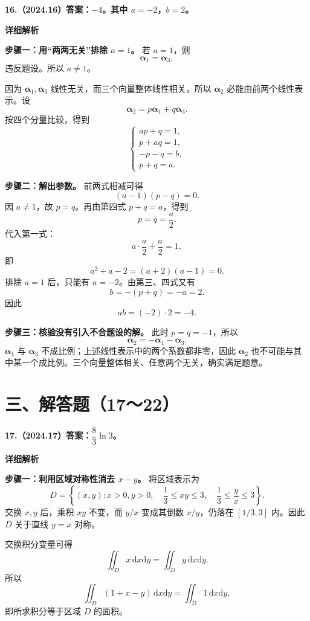 \documentclass[UTF8,11pt,fontset=windows]{ctexart}
\begin{document}
\clearpage

\textbf{16.（2024.16）答案：$-4$。其中 $a=-2$，$b=2$。}

\textbf{详细解析}

\textbf{步骤一：用“两两无关”排除 $a=1$。} 若 $a=1$，则
$$
\boldsymbol\alpha_1=\boldsymbol\alpha_3,
$$
违反题设。所以 $a\ne1$。

因为 $\boldsymbol\alpha_1,\boldsymbol\alpha_3$ 线性无关，而三个向量整体线性相关，所以 $\boldsymbol\alpha_2$ 必能由前两个线性表示。设
$$
\boldsymbol\alpha_2=p\boldsymbol\alpha_1+q\boldsymbol\alpha_3.
$$
按四个分量比较，得到
$$
\begin{cases}
ap+q=1,\\
p+aq=1,\\
-p-q=b,\\
p+q=a.
\end{cases}
$$

\textbf{步骤二：解出参数。} 前两式相减可得
$$
(a-1)(p-q)=0.
$$
因 $a\ne1$，故 $p=q$。再由第四式 $p+q=a$，得到
$$
p=q=\frac a2.
$$
代入第一式：
$$
a\cdot\frac a2+\frac a2=1,
$$
即
$$
a^2+a-2=(a+2)(a-1)=0.
$$
排除 $a=1$ 后，只能有 $a=-2$。由第三、四式又有
$$
b=-(p+q)=-a=2.
$$
因此
$$
\boxed{ab=(-2)\cdot2=-4}.
$$

\textbf{步骤三：核验没有引入不合题设的解。} 此时 $p=q=-1$，所以
$$
\boldsymbol\alpha_2=-\boldsymbol\alpha_1-\boldsymbol\alpha_3.
$$
$\boldsymbol\alpha_1$ 与 $\boldsymbol\alpha_3$ 不成比例；上述线性表示中的两个系数都非零，因此 $\boldsymbol\alpha_2$ 也不可能与其中某一个成比例。三个向量整体相关、任意两个无关，确实满足题意。

\clearpage

\section*{三、解答题（17～22）}

\textbf{17.（2024.17）答案：$\dfrac83\ln3$。}

\textbf{详细解析}

\textbf{步骤一：利用区域对称性消去 $x-y$。} 将区域表示为
$$
D=\left\{(x,y):x>0,y>0,
\quad\frac13\le xy\le3,
\quad\frac13\le\frac yx\le3\right\}.
$$
交换 $x,y$ 后，乘积 $xy$ 不变，而 $y/x$ 变成其倒数 $x/y$，仍落在 $[1/3,3]$ 内。因此 $D$ 关于直线 $y=x$ 对称。

交换积分变量可得
$$
\iint_Dx\,\mathrm dx\mathrm dy
=\iint_Dy\,\mathrm dx\mathrm dy.
$$
所以
$$
\iint_D(1+x-y)\,\mathrm dx\mathrm dy
=\iint_D1\,\mathrm dx\mathrm dy,
$$
即所求积分等于区域 $D$ 的面积。
\end{document}
